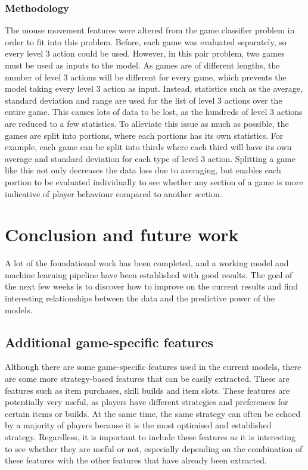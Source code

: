 \documentclass{SizheArticle}
\begin{document}
\subsubsection{Methodology}
The mouse movement features were altered from the game classifier problem in order to fit into this problem. Before, each game was evaluated separately, so every level 3 action could be used. However, in this pair problem, two games must be used as inputs to the model. As games are of different lengths, the number of level 3 actions will be different for every game, which prevents the model taking every level 3 action as input. Instead, statistics such as the average, standard deviation and range are used for the list of level 3 actions over the entire game. This causes lots of data to be lost, as the hundreds of level 3 actions are reduced to a few statistics. To alleviate this issue as much as possible, the games are split into portions, where each portions has its own statistics. For example, each game can be split into thirds where each third will have its own average and standard deviation for each type of level 3 action. Splitting a game like this not only decreases the data loss due to averaging, but enables each portion to be evaluated individually to see whether any section of a game is more indicative of player behaviour compared to another section. 



\section{Conclusion and future work}
A lot of the foundational work has been completed, and a working model and machine learning pipeline have been established with good results. The goal of the next few weeks is to discover how to improve on the current results and find interesting relationships between the data and the predictive power of the models. 

\subsection{Additional game-specific features}
Although there are some game-specific features used in the current models, there are some more strategy-based features that can be easily extracted. These are features such as item purchases, skill builds and item slots. These features are potentially very useful, as players have different strategies and preferences for certain items or builds. At the same time, the same strategy can often be echoed by a majority of players because it is the most optimised and established strategy. Regardless, it is important to include these features as it is interesting to see whether they are useful or not, especially depending on the combination of these features with the other features that have already been extracted. 
\end{document}
